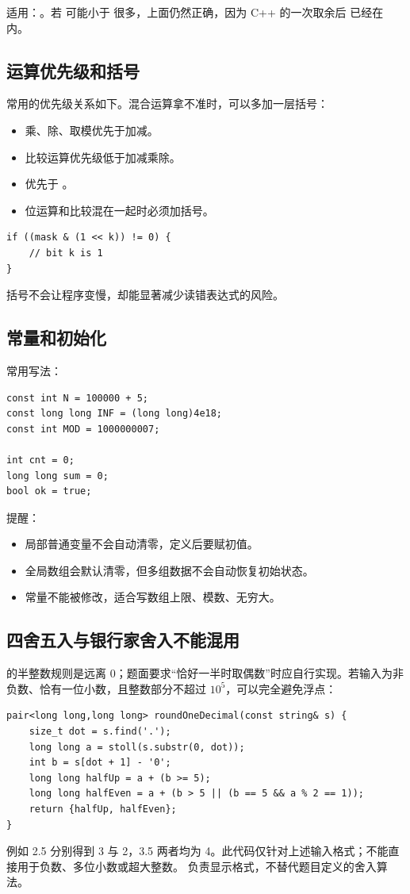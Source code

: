适用：。若  可能小于  很多，上面仍然正确，因为 C++ 的一次取余后  已经在  内。

\subsection{运算优先级和括号}

常用的优先级关系如下。混合运算拿不准时，可以多加一层括号：

\begin{itemize}
  \item 乘、除、取模优先于加减。
  \item 比较运算优先级低于加减乘除。
  \item \Code{\&\&} 优先于 \Code{||}。
  \item 位运算和比较混在一起时必须加括号。
\end{itemize}

\begin{lstlisting}
if ((mask & (1 << k)) != 0) {
    // bit k is 1
}
\end{lstlisting}

括号不会让程序变慢，却能显著减少读错表达式的风险。

\subsection{常量和初始化}

常用写法：

\begin{lstlisting}
const int N = 100000 + 5;
const long long INF = (long long)4e18;
const int MOD = 1000000007;

int cnt = 0;
long long sum = 0;
bool ok = true;
\end{lstlisting}

提醒：

\begin{itemize}
  \item 局部普通变量不会自动清零，定义后要赋初值。
  \item 全局数组会默认清零，但多组数据不会自动恢复初始状态。
  \item {} 常量不能被修改，适合写数组上限、模数、无穷大。
\end{itemize}


\subsection{四舍五入与银行家舍入不能混用}
 的半整数规则是远离 0；题面要求“恰好一半时取偶数”时应自行实现。若输入为非负数、恰有一位小数，且整数部分不超过 $10^5$，可以完全避免浮点：
\begin{lstlisting}
pair<long long,long long> roundOneDecimal(const string& s) {
    size_t dot = s.find('.');
    long long a = stoll(s.substr(0, dot));
    int b = s[dot + 1] - '0';
    long long halfUp = a + (b >= 5);
    long long halfEven = a + (b > 5 || (b == 5 && a % 2 == 1));
    return {halfUp, halfEven};
}
\end{lstlisting}
例如 2.5 分别得到 3 与 2，3.5 两者均为 4。此代码仅针对上述输入格式；不能直接用于负数、多位小数或超大整数。 负责显示格式，不替代题目定义的舍入算法。

